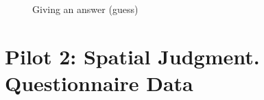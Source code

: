 \begin{appendices}
\begin{figure}
	\par
	\par
	
	\caption{Giving an answer (guess)}
	\label{fig:pilot2tutorialgivinganswer}
\end{figure}


\chapter{Pilot 2: Spatial Judgment. Questionnaire Data}
\label{app:pilot2questionnaire_data}



\end{appendices}
